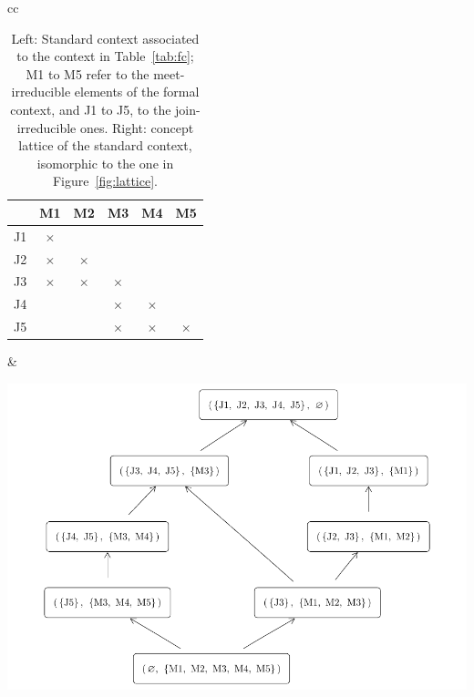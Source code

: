 \begin{table}

\begin{tabular}{cc}
\begin{minipage}{0.40\linewidth}
    \centering
    \small

\begin{tabular}{lccccc} \toprule  & M1 & M2 & M3 & M4 & M5\\ \midrule J1 & $\times$ &   &   &   &  \\  J2 & $\times$ & $\times$ &   &   &  \\  J3 & $\times$ & $\times$ & $\times$ &   &  \\  J4 &   &   & $\times$ & $\times$ &  \\  J5 &   &   & $\times$ & $\times$ & $\times$\\ \bottomrule \end{tabular}

  \end{minipage}
  &

\begin{minipage}{0.50\linewidth}

\centering\includegraphics[width=\linewidth]{fig-std-lattice.pdf}


\end{minipage} \\
\end{tabular}
\caption{Left: Standard context associated to the context in Table~\ref{tab:fc}; M1 to M5 refer to the meet-irreducible elements of the formal context, and J1 to J5, to the join-irreducible ones. Right: concept lattice of the standard context, isomorphic to the one in Figure~\ref{fig:lattice}.}\label{tab:std}
\end{table}

